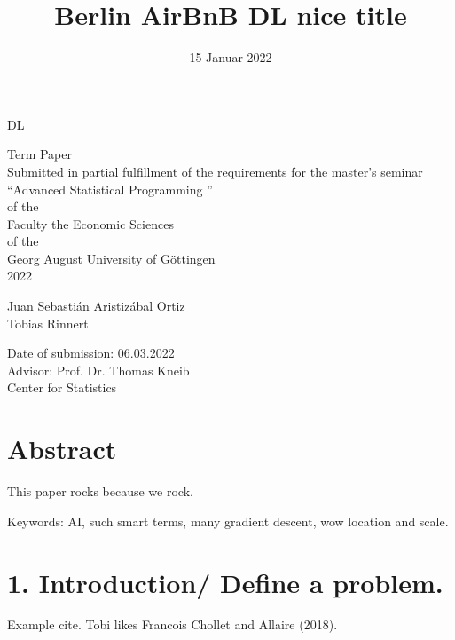 \documentclass[
]{report}
\title{Berlin AirBnB DL nice title}
\author{}
\date{\vspace{-2.5em}15 Januar 2022}
\begin{document}
\maketitle

\begin{titlepage}
\vspace*{3.5cm}
\centering
{\LARGE DL}\\[2\baselineskip]
{\LARGE  Term Paper  \\
 Submitted in partial fulfillment of the requirements for the  master's seminar\\
\textquotedblleft Advanced Statistical Programming \textquotedblright\ \\
of the \\
Faculty the Economic Sciences \\
of the \\
Georg August University of Göttingen\\
2022 \par}
\vspace*{\fill}
\begin{flushleft}
Juan Sebastián Aristizábal Ortiz\\
Tobias Rinnert

Date of submission: 06.03.2022\\
\vspace{10mm}
Advisor: Prof. Dr. Thomas Kneib\\
Center for Statistics\\
\end{flushleft}
\thispagestyle{empty}
\end{titlepage}

\hypertarget{abstract}{%
\chapter{Abstract}\label{abstract}}

This paper rocks because we rock.

Keywords: AI, such smart terms, many gradient descent, wow location and
scale.

\hypertarget{introduction-define-a-problem.}{%
\chapter{1. Introduction/ Define a
problem.}\label{introduction-define-a-problem.}}

Example cite. Tobi likes Francois Chollet and Allaire (2018).
\end{document}
